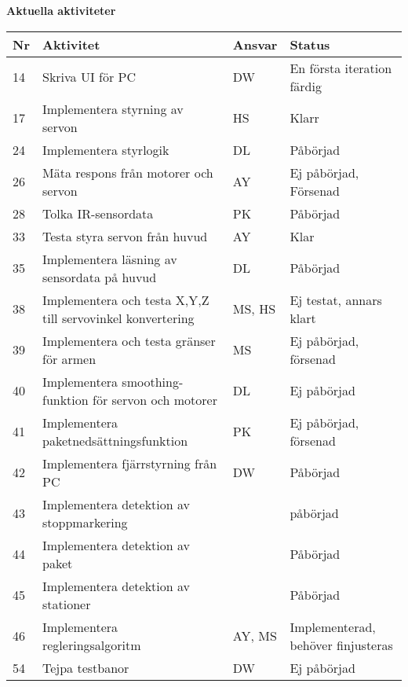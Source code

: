 \documentclass[titlepage, a4paper]{article}
\begin{document}
\newpage
\textbf{\Large Aktuella aktiviteter}
\begin{center}
\begin{tabularx}{\textwidth}{| p{4mm} | X | p{13.5mm} | X |}
	\hline
	\textbf{Nr} & \textbf{Aktivitet} & \textbf{Ansvar} & \textbf{Status} \\\hline
	{14} & {Skriva UI för PC} & {DW} & {En första iteration färdig} \\\hline
	{17} & {Implementera styrning av servon} & {HS} & {Klarr} \\\hline
	{24} & {Implementera styrlogik} & {DL} & {Påbörjad} \\\hline
	{26} & {Mäta respons från motorer och servon} & {AY} & {Ej påbörjad, Försenad} \\\hline
	{28} & {Tolka IR-sensordata} & {PK} & {Påbörjad} \\\hline
	{33} & {Testa styra servon från huvud} & {AY} & {Klar} \\\hline
	{35} & {Implementera läsning av sensordata på huvud} & {DL} & {Påbörjad} \\\hline
	{38} & {Implementera och testa X,Y,Z  till servovinkel konvertering} & {MS, HS} & {Ej testat, annars klart} \\\hline
	{39} & {Implementera och testa gränser för armen} & {MS} & {Ej påbörjad, försenad} \\\hline
	{40} & {Implementera smoothing-funktion för servon och motorer} & {DL} & {Ej påbörjad} \\\hline
	{41} & {Implementera paketnedsättningsfunktion} & {PK} & {Ej påbörjad, försenad} \\\hline
	{42} & {Implementera fjärrstyrning från PC} & {DW} & {Påbörjad} \\\hline
	{43} & {Implementera detektion av stoppmarkering} & {} & {påbörjad} \\\hline
	{44} & {Implementera detektion av paket} & {} & {Påbörjad} \\\hline
	{45} & {Implementera detektion av stationer} & {} & {Påbörjad} \\\hline
	{46} & {Implementera regleringsalgoritm} & {AY, MS} & {Implementerad, behöver finjusteras} \\\hline
	{54} & {Tejpa testbanor} & {DW} & {Ej påbörjad} \\\hline
\end{tabularx}
\end{center}
\end{document}
